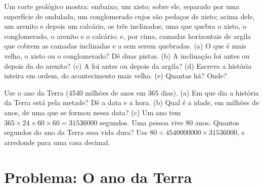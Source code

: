 \begin{exercise}[$\star\star\star$]\label{exo:g7:geological-time:11}
Um corte geológico mostra: embaixo, um xisto; sobre ele, separado por uma
superfície de  ondulada, um conglomerado cujos  são pedaços
de xisto; acima dele, um arenito e depois um calcário, os três
inclinados; uma  que quebra o xisto, o conglomerado, o arenito e o
calcário; e, por cima, camadas horizontais de argila que cobrem as
camadas inclinadas e a  sem serem quebradas. (a) O que é mais
velho, o xisto ou o conglomerado? Dê duas pistas. (b) A inclinação foi
antes ou depois da  do arenito? (c) A  foi antes ou depois
da argila? (d) Escreva a história inteira em ordem, do acontecimento
mais velho. (e) Quantas  há? Onde?
\end{exercise}

\begin{exercise}[$\star\star\star$]\label{exo:g7:geological-time:12}
Use o ano da Terra (\num{4540} milhões de anos em 365 dias). (a) Em que
dia a história da Terra está pela metade? Dê a data e a hora. (b) Qual é
a idade, em milhões de anos, de uma  que se formou nessa data?
(c) Um ano tem $365 \times 24 \times 60 \times 60 = \num{31536000}$
segundos. Uma pessoa vive 80 anos. Quantos segundos do ano da Terra essa
vida dura? Use $80 \div \num{4540000000} \times
\num{31536000}$, e arredonde para uma casa decimal.
\end{exercise}

\section{Problema: O ano da Terra}

